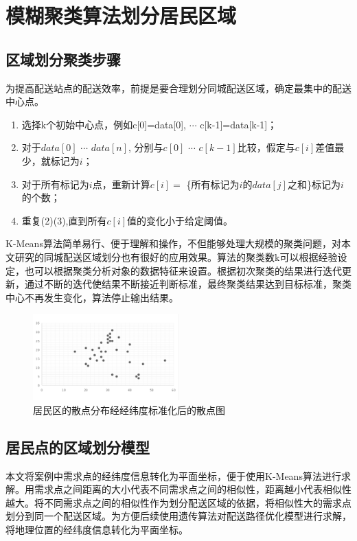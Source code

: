 \clearpage
\section{模糊聚类算法划分居民区域}
\subsection{区域划分聚类步骤}
为提高配送站点的配送效率，前提是要合理划分同城配送区域，确定最集中的配送中心点。

\begin{enumerate}
    \item 选择\rm{k}个初始中心点，例如\rm{c[0]=data[0]}, $\cdots$ \rm{c[k-1]=data[k-1]}；
    \item 对于$data[0]$ $\cdots$ $data[n]$, 分别与$c[0]$ $\cdots$ $c[k-1]$比较，假定与$c[i]$差值最少，就标记为$i$；
    \item 对于所有标记为$i$点，重新计算$c[i]=$ \{所有标记为$i$的$data[j]$之和\}标记为$i$的个数；
    \item 重复(2)(3),直到所有$c[i]$值的变化小于给定阈值。
\end{enumerate}

K-Means算法简单易行、便于理解和操作，不但能够处理大规模的聚类问题，对本文研究的同城配送区域划分也有很好的应用效果。算法的聚类数k可以根据经验设定，也可以根据聚类分析对象的数据特征来设置。根据初次聚类的结果进行迭代更新，通过不断的迭代使结果不断接近判断标准，最终聚类结果达到目标标准，聚类中心不再发生变化，算法停止输出结果。

 \begin{figure}[h]
     \centering
     \includegraphics[width=0.5\textwidth]{fig3/fig31.png}
     \caption{居民区的散点分布经经纬度标准化后的散点图}
     \label{fig:my_label}
 \end{figure}
\FloatBarrier
\subsection{居民点的区域划分模型}
\par 本文将案例中需求点的经纬度信息转化为平面坐标，便于使用\rm{K-Means}算法进行求解。用需求点之间距离的大小代表不同需求点之间的相似性，距离越小代表相似性越大。将不同需求点之间的相似性作为划分配送区域的依据，将相似性大的需求点划分到同一个配送区域。为方便后续使用遗传算法对配送路径优化模型进行求解，将地理位置的经纬度信息转化为平面坐标。

